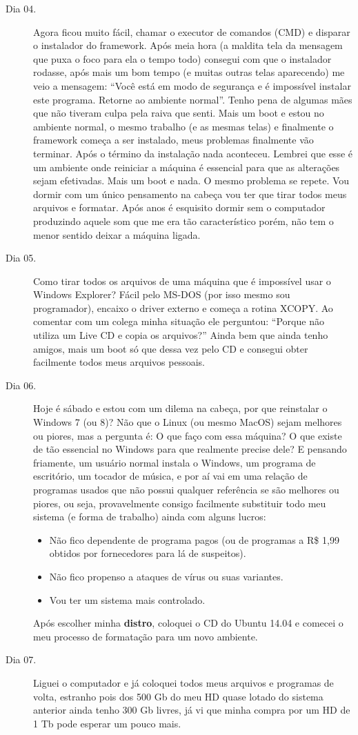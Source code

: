 \begin{description}
 \item[Dia 04.] Agora ficou muito fácil, chamar o executor de comandos (CMD) e disparar o instalador do framework. Após meia hora (a maldita tela da mensagem que puxa o foco para ela o tempo todo) consegui com que o instalador rodasse, após mais um bom tempo (e muitas outras telas aparecendo) me veio a mensagem: ``Você está em modo de segurança e é impossível instalar este programa. Retorne ao ambiente normal''. Tenho pena de algumas mães que não tiveram culpa pela raiva que senti. Mais um boot e estou no ambiente normal, o mesmo trabalho (e as mesmas telas) e finalmente o framework começa a ser instalado, meus problemas finalmente vão terminar. Após o término da instalação nada aconteceu. Lembrei que esse é um ambiente onde reiniciar a máquina é essencial para que as alterações sejam efetivadas. Mais um boot e nada. O mesmo problema se repete. Vou dormir com um único pensamento na cabeça vou ter que tirar todos meus arquivos e formatar. Após anos é esquisito dormir sem o computador produzindo aquele som que me era tão característico porém, não tem o menor sentido deixar a máquina ligada. 
 \item[Dia 05.] Como tirar todos os arquivos de uma máquina que é impossível usar o Windows Explorer? Fácil pelo MS-DOS (por isso mesmo sou programador), encaixo o driver externo e começa a rotina XCOPY. Ao comentar com um colega minha situação ele perguntou: ``Porque não utiliza um Live CD e copia os arquivos?'' Ainda bem que ainda tenho amigos, mais um boot só que dessa vez pelo CD e consegui obter facilmente todos meus arquivos pessoais.
 \item[Dia 06.] Hoje é sábado e estou com um dilema na cabeça, por que reinstalar o Windows 7 (ou 8)? Não que o Linux (ou mesmo MacOS) sejam melhores ou piores, mas a pergunta é: O que faço com essa máquina? O que existe de tão essencial no Windows para que realmente precise dele? E pensando friamente, um usuário normal instala o Windows, um programa de escritório, um tocador de música, e por aí vai em uma relação de programas usados que não possui qualquer referência se são melhores ou piores, ou seja, provavelmente consigo facilmente substituir todo meu sistema (e forma de trabalho) ainda com alguns lucros:
 \begin{itemize}[noitemsep]
  \item Não fico dependente de programa pagos (ou de programas a R\$ 1,99 obtidos por fornecedores para lá de suspeitos).
  \item Não fico propenso a ataques de vírus ou suas variantes.
  \item Vou ter um sistema mais controlado.
 \end{itemize} 
 Após escolher minha \textbf{distro}, coloquei o CD do Ubuntu 14.04 e comecei o meu processo de formatação para um novo ambiente.
 \item[Dia 07.] Liguei o computador e já coloquei todos meus arquivos e programas de volta, estranho pois dos 500 Gb do meu HD quase lotado do sistema anterior ainda tenho 300 Gb livres, já vi que minha compra por um HD de 1 Tb pode esperar um pouco mais.
\end{description}
